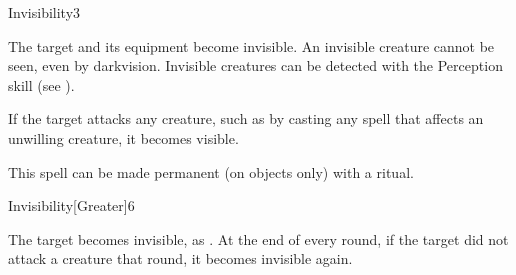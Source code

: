 \begin{spellsection}{Invisibility}{3}
\begin{spellheader}
\end{spellheader}
\begin{spellcontent}
    \begin{spelltargetinginfo}
    \end{spelltargetinginfo}
    \begin{spelleffects}
        \spelleffect The target and its equipment become invisible. An invisible creature cannot be seen, even by darkvision. Invisible creatures can be detected with the Perception skill (see ).

        If the target attacks any creature, such as by casting any spell that affects an unwilling creature, it becomes visible.
        \spelldur \durshort \dismissable
    \end{spelleffects}
\end{spellcontent}
\begin{spellfooter}
    \spellnotes This spell can be made permanent (on objects only) with a  ritual.
\end{spellfooter}
\end{spellsection}

\begin{spellsection}{Invisibility}[Greater]{6}
\begin{spellheader}
\end{spellheader}
\begin{spellcontent}
    \begin{spelltargetinginfo}
    \end{spelltargetinginfo}
    \begin{spelleffects}
        \spelleffect The target becomes invisible, as . At the end of every round, if the target did not attack a creature that round, it becomes invisible again.
        \spelldur \durshort \dismissable
    \end{spelleffects}
\end{spellcontent}
\begin{spellfooter}
\end{spellfooter}
\end{spellsection}

